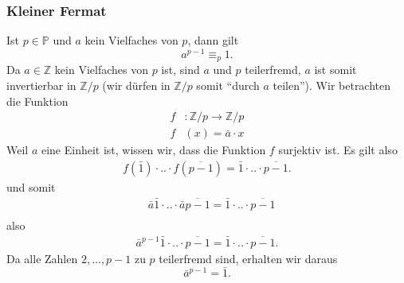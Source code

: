 \subsubsection{Kleiner Fermat}
Ist $p\in\mathbb{P}$ und $a$ kein Vielfaches von $p$, dann gilt
\[
a^{p-1}\equiv_p1.
\]
Da $a\in\mathbb{Z}$ kein Vielfaches von $p$ ist, sind $a$ und $p$ teilerfremd, $a$ ist somit invertierbar in $\mathbb{Z}/p$ (wir dürfen in $\mathbb{Z}/p$ somit ``durch $a$ teilen''). Wir betrachten die Funktion
\begin{align*}
f&:\mathbb{Z}/p\to\mathbb{Z}/p\\
f&(x)=\bar a\cdot x
\end{align*}
Weil $a$ eine Einheit ist, wissen wir, dass die Funktion $f$ surjektiv ist. Es gilt also
\begin{align*}
f(\bar 1)\cdot.. \cdot f(\overline{p-1})=\bar 1\cdot..\cdot \overline{p-1}.
\end{align*}
und somit
\begin{align*}
&\bar a\bar 1\cdot.. \cdot \bar a\overline{p-1}=\bar 1\cdot..\cdot \overline{p-1}\\
\end{align*}
also
\begin{align*}
\bar a^{p-1}\bar 1\cdot.. \cdot \overline{p-1}=\bar 1\cdot..\cdot \overline{p-1}.
\end{align*}
Da alle Zahlen $2,\dots,p-1$ zu $p$ teilerfremd sind, erhalten wir daraus
\[
\bar a^{p-1}=\bar 1.
\]
